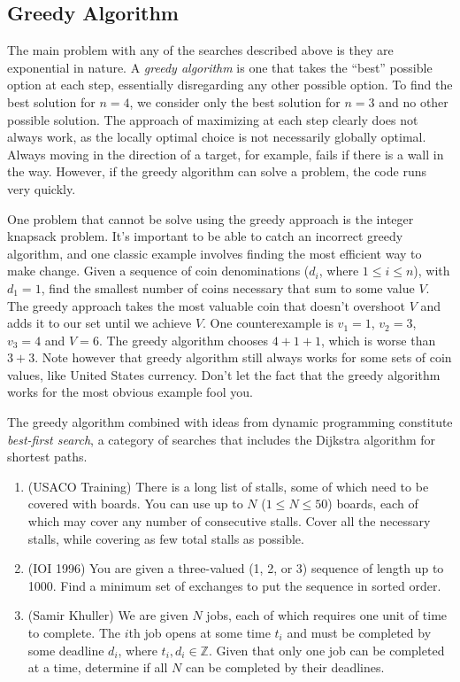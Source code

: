 \documentclass[11pt]{book}
\begin{document}
\subsection{Greedy Algorithm}

The main problem with any of the searches described above is they are exponential in nature. A \textit{greedy algorithm} is one that takes the ``best'' possible option at each step, essentially disregarding any other possible option. To find the best solution for $n=4$, we consider only the best solution for $n=3$ and no other possible solution. The approach of maximizing at each step clearly does not always work, as the locally optimal choice is not necessarily globally optimal. Always moving in the direction of a target, for example, fails if there is a wall in the way. However, if the greedy algorithm can solve a problem, the code runs very quickly.

One problem that cannot be solve using the greedy approach is the integer knapsack problem. It's important to be able to catch an incorrect greedy algorithm, and one classic
example involves finding the most efficient way to make change. Given a sequence of coin denominations ($d_i$, where $1 \le i \le n$), with $d_1 = 1$, find the smallest number of coins necessary that sum to some value $V$. The greedy approach takes the most valuable coin that doesn't overshoot $V$ and adds it to our set until we achieve $V$. One counterexample is $v_1=1$, $v_2=3$, $v_3=4$ and $V = 6$. The greedy algorithm chooses $4+1+1$, which is worse than $3+3$. Note however that greedy algorithm still always works for some sets of coin values, like United States currency. Don't let the fact that the greedy algorithm works for the most obvious example fool you.

The greedy algorithm combined with ideas from dynamic programming constitute \textit{best-first search}, a category of searches that includes the Dijkstra algorithm for shortest paths.

\begin{enumerate}

\item
(USACO Training)
There is a long list of stalls, some of which need to be covered with boards. You can use up to $N$ ($1 \le N \le 50$) boards, each of which may cover any number of consecutive stalls. Cover all the necessary stalls, while covering as few total stalls as possible.

\item
(IOI 1996)
You are given a three-valued (1, 2, or 3) sequence of length up to 1000. Find a minimum set of exchanges to put the sequence in sorted order.

\item
(Samir Khuller)
We are given $N$ jobs, each of which requires one unit of time to complete. The $i$th job opens at some time $t_i$ and must be completed by some deadline $d_i$, where $t_i,d_i\in \mathbb{Z}$. Given that only one job can be completed at a time, determine if all $N$ can be completed by their deadlines.

\end{enumerate}
\end{document}
